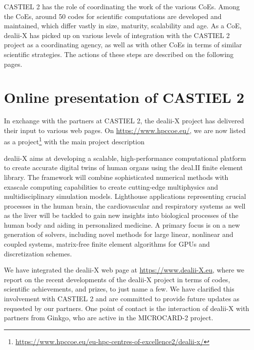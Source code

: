 \documentclass[a4paper,12pt]{article}
\begin{document}
CASTIEL 2 has the role of coordinating the work of the various CoEs. Among the
CoEs, around 50 codes for scientific computations are developed and
maintained, which differ vastly in size, maturity, scalability and age. As a
CoE, dealii-X has picked up on various levels of integration with the CASTIEL
2 project as a coordinating agency, as well as with other CoEs in terms of
similar scientific strategies. The actions of these steps are described on the
following pages.

\section{Online presentation of CASTIEL 2}

In exchange with the partners at CASTIEL 2, the dealii-X project has delivered
their input to various web pages. On \url{https://www.hpccoe.eu/}, we are now
listed as a
project\footnote{\url{https://www.hpccoe.eu/eu-hpc-centres-of-excellence2/dealii-x/}}
with the main project description

\begin{center}
  \begin{minipage}{0.8\textwidth}
    \textcolor{EUblue}{dealii-X} aims at developing a scalable,
    high-performance computational platform to create accurate digital twins
    of human organs using the deal.II finite element library. The framework
    will combine sophisticated numerical methods with exascale computing
    capabilities to create cutting-edge multiphysics and multidisciplinary
    simulation models. Lighthouse applications representing crucial processes
    in the human brain, the cardiovascular and respiratory systems as well as
    the liver will be tackled to gain new insights into biological processes
    of the human body and aiding in personalized medicine. A primary focus is
    on a new generation of solvers, including novel methods for large linear,
    nonlinear and coupled systems, matrix-free finite element algorithms for
    GPUs and discretization schemes.
  \end{minipage}
\end{center}

We have integrated the dealii-X web page at \url{https://www.dealii-X.eu},
where we report on the recent developments of the dealii-X project in terms of
codes, scientific achievements, and prizes, to just name a few. We have
clarified this involvement with CASTIEL 2 and are committed to provide future
updates as requested by our partners. One point of contact is the interaction
of dealii-X with partners from Ginkgo, who are active in the MICROCARD-2
project.
\end{document}
